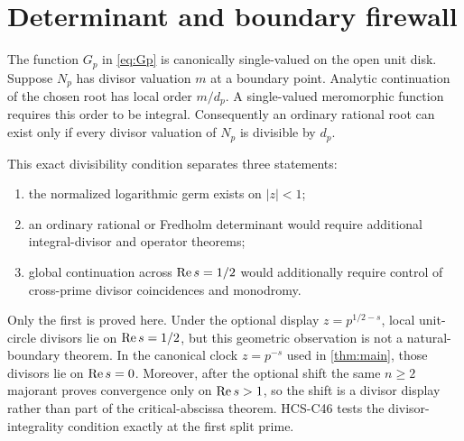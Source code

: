 \section{Determinant and boundary firewall}

The function $G_p$ in \eqref{eq:Gp} is canonically single-valued on the open
unit disk.  Suppose $N_p$ has divisor valuation $m$ at a boundary point.
Analytic continuation of the chosen root has local order $m/d_p$.  A
single-valued meromorphic function requires this order to be integral.
Consequently an ordinary rational root can exist only if every divisor
valuation of $N_p$ is divisible by $d_p$.

This exact divisibility condition separates three statements:

\begin{enumerate}
\item the normalized logarithmic germ exists on $|z|<1$;
\item an ordinary rational or Fredholm determinant would require additional
      integral-divisor and operator theorems;
\item global continuation across $\operatorname{Re} s=1/2$ would additionally require
      control of cross-prime divisor coincidences and monodromy.
\end{enumerate}

Only the first is proved here.  Under the optional display
$z=p^{1/2-s}$, local unit-circle divisors lie on $\operatorname{Re} s=1/2$, but this
geometric observation is not a natural-boundary theorem.  In the canonical
clock $z=p^{-s}$ used in \cref{thm:main}, those divisors lie on
$\operatorname{Re} s=0$.  Moreover, after the optional shift the same $n\ge2$
majorant proves convergence only on $\operatorname{Re} s>1$, so the shift is a divisor
display rather than part of the critical-abscissa theorem.  HCS-C46 tests the
divisor-integrality condition exactly at the first split prime.
